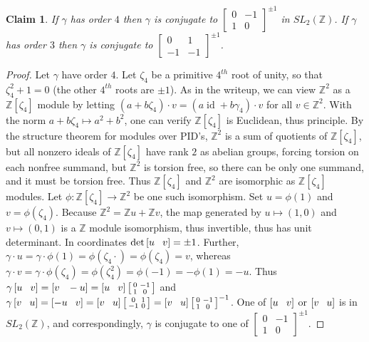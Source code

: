 \documentclass[18pt]{amsart}
\newcommand{\Z}{\mathbb{Z}}
\newcommand{\tbt}[4]{\left[ \begin{smallmatrix}
		#1 & #2 \\
		#3 & #4 
	\end{smallmatrix} \right] }
\newtheorem{claim}{Claim}
\newcommand{\id}{\operatorname{id}}
\begin{document}
	\begin{claim}
		If $\gamma$ has order $4$ then $\gamma$ is conjugate to $\tbt{0}{-1}{1}{0}^{\pm 1}$ in $SL_2 (\Z)$. If $\gamma$ has order $3$ then $\gamma$ is conjugate to $\tbt{0}{1}{-1}{-1}^{\pm 1}$.
	\end{claim}
	\begin{proof}
		Let $\gamma$ have order $4$. Let $\zeta_4$ be a primitive $4^{th}$ root of unity, so that $\zeta_{4}^2+1=0$ (the other $4^{th}$ roots are $\pm1$). As in the writeup, we can view $\Z^2$ as a $\Z[\zeta_4]$ module by letting $(a+b \zeta_4)\cdot v=(a \id +b \gamma_4)\cdot v$ for all $v\in \Z^2$. With the norm $a+b \zeta_4 \mapsto  a^2+b^2$, one can verify $\Z[\zeta_4]$ is Euclidean, thus principle. By the structure theorem for modules over PID's, $\Z^2$ is a sum of quotients of $\Z[\zeta_4]$, but all nonzero ideals of $\Z[\zeta_4]$ have rank $2$ as abelian groups, forcing torsion on each nonfree summand, but $\Z^2$ is torsion free, so there can be only one summand, and it must be torsion free. Thus $\Z[\zeta_4]$ and $\Z^2$ are isomorphic as $\Z[\zeta_4]$ modules. Let $\phi:\Z[\zeta_4]\to\Z^2$ be one such isomorphism. Set $u=\phi(1)$ and $v=\phi(\zeta_4)$. Because $\Z^2=\Z u+\Z v$, the map generated by $u\mapsto (1,0)$ and $v\mapsto (0,1)$ is a $\Z$ module isomorphism, thus invertible, thus has unit determinant. In coordinates $\det \left[ u \hspace{8 pt} v\right]=\pm1$. Further, $\gamma \cdot u=\gamma \cdot \phi(1)=\phi(\zeta_4 \cdot )=\phi(\zeta_4)=v$, whereas $\gamma \cdot v =\gamma \cdot \phi(\zeta_4)=\phi(\zeta_{4}^{2})=\phi(-1)=-\phi(1)=-u$. Thus $\gamma \left[ u \hspace{8 pt} v\right] = \left[ v \hspace{8 pt} -u \right]=\left[ u \hspace{8 pt} v\right]  \tbt{0}{-1}{1}{0}$ and $\gamma \left[ v \hspace{8 pt} u \right] = \left[ -u \hspace{8 pt} v \right]= \left[ v \hspace{8 pt} u\right] \tbt{0}{1}{-1}{0}=\left[ v \hspace{8 pt} u\right] \tbt{0}{-1}{1}{0}^{-1}$. One of $\left[ u \hspace{8 pt} v\right]$ or $\left[ v \hspace{8 pt} u \right]$ is in $SL_2(\Z)$, and correspondingly, $\gamma$ is conjugate to one of $\tbt{0}{-1}{1}{0}^{\pm 1}$.
		

\end{proof}
\end{document}
